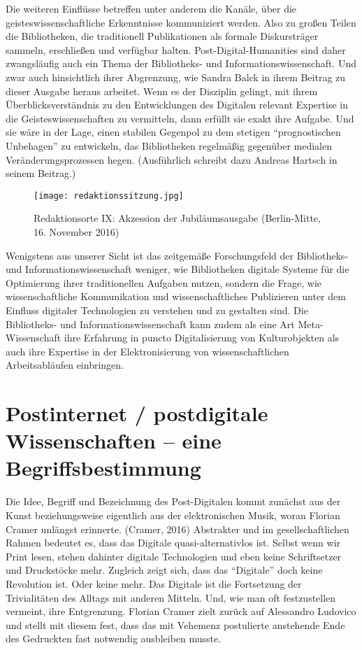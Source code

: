 \documentclass[a4paper,
fontsize=11pt,
oneside,
numbers=noperiodatend,
parskip=half-,
bibliography=totoc,
final
]{scrartcl}
\begin{document}
Die weiteren Einflüsse betreffen unter anderem die Kanäle, über die
geisteswissenschaftliche Erkenntnisse kommuniziert werden. Also zu
großen Teilen die Bibliotheken, die traditionell Publikationen als
formale Diskursträger sammeln, erschließen und verfügbar halten.
Post-Digital-Humanities sind daher zwangsläufig auch ein Thema der
Bibliotheks- und Informationswissenschaft. Und zwar auch hinsichtlich
ihrer Abgrenzung, wie Sandra Balck in ihrem Beitrag zu dieser Ausgabe
heraus arbeitet. Wenn es der Disziplin gelingt, mit ihrem
Überblicksverständnis zu den Entwicklungen des Digitalen relevant
Expertise in die Geisteswissenschaften zu vermitteln, dann erfüllt sie
exakt ihre Aufgabe. Und sie wäre in der Lage, einen stabilen Gegenpol zu
dem stetigen \enquote{prognostischen Unbehagen} zu entwickeln, das
Bibliotheken regelmäßig gegenüber medialen Veränderungsprozessen hegen.
(Ausführlich schreibt dazu Andreas Hartsch in seinem Beitrag.)

\begin{figure}
\centering
\texttt{[image: redaktionssitzung.jpg]}
\caption{Redaktionsorte IX: Akzession der Jubiläumsausgabe
(Berlin-Mitte, 16. November 2016)}
\end{figure}

Wenigstens aus unserer Sicht ist das zeitgemäße Forschungsfeld der
Bibliotheks- und Informationswissenschaft weniger, wie Bibliotheken
digitale Systeme für die Optimierung ihrer traditionellen Aufgaben
nutzen, sondern die Frage, wie wissenschaftliche Kommunikation und
wissenschaftliches Publizieren unter dem Einfluss digitaler Technologien
zu verstehen und zu gestalten sind. Die Bibliotheks- und
Informationswissenschaft kann zudem als eine Art Meta-Wissenschaft ihre
Erfahrung in puncto Digitalisierung von Kulturobjekten als auch ihre
Expertise in der Elektronisierung von wissenschaftlichen Arbeitsabläufen
einbringen.

\section*{Postinternet / postdigitale Wissenschaften -- eine
Begriffsbestimmung}\label{postinternet-postdigitale-wissenschaften-eine-begriffsbestimmung}

Die Idee, Begriff und Bezeichnung des Post-Digitalen kommt zunächst aus
der Kunst beziehungsweise eigentlich aus der elektronischen Musik, woran
Florian Cramer unlängst erinnerte. (Cramer, 2016) Abstrakter und im
gesellschaftlichen Rahmen bedeutet es, dass das Digitale
quasi-alternativlos ist. Selbst wenn wir Print lesen, stehen dahinter
digitale Technologien und eben keine Schriftsetzer und Druckstöcke mehr.
Zugleich zeigt sich, dass das \enquote{Digitale} doch keine Revolution
ist. Oder keine mehr. Das Digitale ist die Fortsetzung der Trivialitäten
des Alltags mit anderen Mitteln. Und, wie man oft festzustellen
vermeint, ihre Entgrenzung. Florian Cramer zielt zurück auf Alessandro
Ludovico und stellt mit diesem fest, dass das mit Vehemenz postulierte
anstehende Ende des Gedruckten fast notwendig ausbleiben musste.
\end{document}
